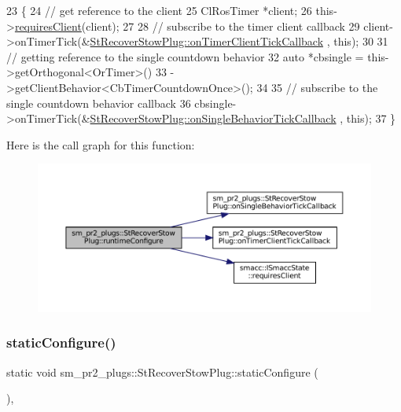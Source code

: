 \begin{DoxyCode}
23     \{
24         \textcolor{comment}{// get reference to the client}
25         ClRosTimer *client;
26         this->\hyperlink{classsmacc_1_1ISmaccState_a7f95c9f0a6ea2d6f18d1aec0519de4ac}{requiresClient}(client);
27 
28         \textcolor{comment}{// subscribe to the timer client callback}
29         client->onTimerTick(&\hyperlink{structsm__pr2__plugs_1_1StRecoverStowPlug_adda940da8f2073a8bcf5ce4d06baccf2}{StRecoverStowPlug::onTimerClientTickCallback}
      , \textcolor{keyword}{this});
30 
31         \textcolor{comment}{// getting reference to the single countdown behavior}
32         \textcolor{keyword}{auto} *cbsingle = this->getOrthogonal<OrTimer>()
33                              ->getClientBehavior<CbTimerCountdownOnce>();
34 
35         \textcolor{comment}{// subscribe to the single countdown behavior callback}
36         cbsingle->onTimerTick(&\hyperlink{structsm__pr2__plugs_1_1StRecoverStowPlug_af118f0e9ead8955ef7152fb8f55474ab}{StRecoverStowPlug::onSingleBehaviorTickCallback}
      , \textcolor{keyword}{this});
37     \}
\end{DoxyCode}
Here is the call graph for this function\+:
\nopagebreak
\begin{figure}[H]
\begin{center}
\leavevmode
\includegraphics[width=350pt]{structsm__pr2__plugs_1_1StRecoverStowPlug_a5f2f825961ceda59ed4811aaca86bbcf_cgraph}
\end{center}
\end{figure}
\mbox{\label{structsm__pr2__plugs_1_1StRecoverStowPlug_a8ac2f706967a6f32561d26dfa894ce04}} 
\subsubsection{\texorpdfstring{static\+Configure()}{staticConfigure()}}
{\footnotesize\ttfamily static void sm\+\_\+pr2\+\_\+plugs\+::\+St\+Recover\+Stow\+Plug\+::static\+Configure (\begin{DoxyParamCaption}{ }\end{DoxyParamCaption})\hspace{0.3cm}{\ttfamily [inline]}, {\ttfamily [static]}}



